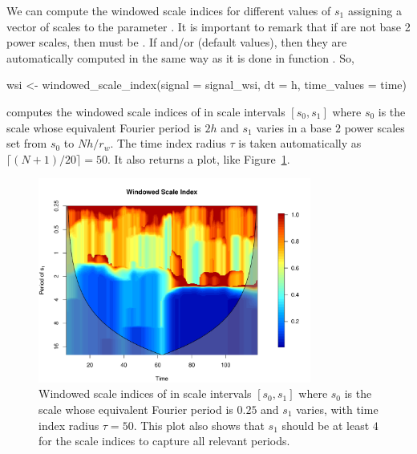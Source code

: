 We can compute the windowed scale indices for different values of $s_1$ assigning a vector of scales to the parameter . It is important to remark that if  are not base 2 power scales, then  must be . If  and/or  (default values), then they are automatically computed in the same way as it is done in function . So,
\begin{example}
wsi <- windowed_scale_index(signal = signal_wsi, dt = h,
                            time_values = time)
\end{example}
computes the windowed scale indices of  in scale intervals $\left[ s_0,s_1\right] $ where $s_0$ is the scale whose equivalent Fourier period is $2h$ and $s_1$ varies in a base $2$ power scales set from $s_0$ to $Nh/r_w$. The time index radius $\tau $ is taken automatically as $\lceil (N+1)/20\rceil =50$. It also returns a plot, like Figure~\ref{fig:wsidx}.

\begin{figure}[tbp]
\begin{center}
  \includegraphics[width=0.8\textwidth]{Figure11}
\end{center}
\caption{Windowed scale indices of  in scale intervals $\left[ s_0,s_1\right] $ where $s_0$ is the scale whose equivalent Fourier period is $0.25$ and $s_1$ varies, with time index radius $\tau =50$. This plot also shows that $s_1$ should be at least $4$ for the scale indices to capture all relevant periods.}
\label{fig:wsidx}
\end{figure}

